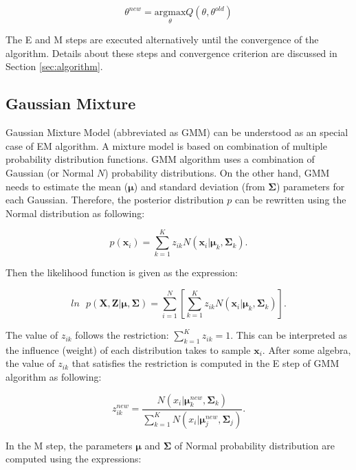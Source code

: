 \begin{equation}
    \theta^{new} = \underset{\theta}{\mathrm{arg max }} Q(\theta, \theta^{old})
\end{equation}

The E and M steps are executed alternatively until the convergence of the algorithm. Details about these steps and convergence criterion are discussed in Section \ref{sec:algorithm}. 

\subsection{Gaussian Mixture}

Gaussian Mixture Model (abbreviated as GMM) \cite{richardson1997bayesian} can be understood as an special case of EM algorithm. A mixture model is based on combination of multiple probability distribution functions. GMM algorithm uses a combination of Gaussian (or Normal $N$) probability distributions. On the other hand, GMM needs to estimate the mean ($\bm{\mu}$) and standard deviation (from $\bm{\Sigma}$) parameters for each Gaussian. Therefore, the posterior distribution $p$ can be rewritten using the Normal distribution as following: 

\begin{equation}
    p(\textbf{x}_i) = \sum_{k=1}^K z_{ik} N(\textbf{x}_i| \bm{\mu}_k, \bm{\Sigma}_k).
\end{equation}

Then the likelihood function is given as the expression:

\begin{equation}
    ln \text{ } p(\textbf{X}, \textbf{Z}|\bm{\mu}, \bm{\Sigma}) = \sum_{i=1}^N \left[ \sum_{k=1}^K z_{ik} N(\textbf{x}_i| \bm{\mu}_k, \bm{\Sigma}_k) \right].
\end{equation}

The value of $z_{ik}$ follows the restriction: $\sum_{k=1}^K z_{ik}=1$. This can be interpreted as the influence (weight) of each distribution takes to sample $\textbf{x}_i$. After some algebra, the value of $z_{ik}$ that satisfies the restriction is computed in the E step of GMM algorithm as following:

\begin{equation}
    z_{ik}^{new} = \frac{N(x_i|\bm{\mu}_k^{new}, \bm{\Sigma}_k)}{\sum_{k=1}^K N(x_i|\bm{\mu}_j^{new}, \bm{\Sigma}_j)}.
\label{z_new}
\end{equation}

In the M step, the parameters $\bm{\mu}$ and $\bm{\Sigma}$ of Normal probability distribution are computed using the expressions:

